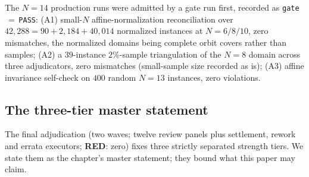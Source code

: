 The $N=14$ production runs were admitted by a gate run first, recorded as
\texttt{gate}$\,=$\,\texttt{PASS}: (A1) small-$N$ affine-normalization reconciliation over
$42{,}288=90+2{,}184+40{,}014$ normalized instances at $N=6/8/10$, zero mismatches, the
normalized domains being complete orbit covers rather than samples; (A2) a $39$-instance
$2\%$-sample triangulation of the $N=8$ domain across three adjudicators, zero mismatches
(small-sample size recorded as is); (A3) affine invariance self-check on $400$ random
$N=13$ instances, zero violations.

\subsection{The three-tier master statement}\label{subsec:machmaster}

The final adjudication (two waves; twelve review panels plus settlement, rework and
errata executors; \textbf{RED}: zero) fixes three strictly separated strength tiers. We
state them as the chapter's master statement; they bound what this paper may claim.

